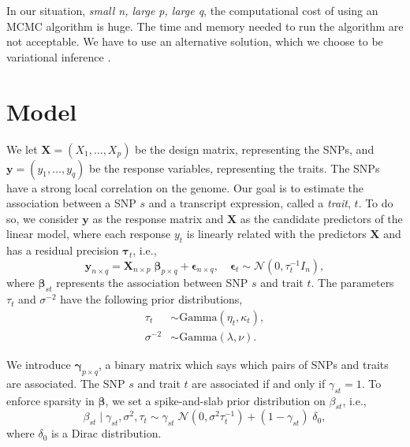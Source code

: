 \documentclass[a4paper, 11pt]{report}
\numberwithin{equation}{section}
\begin{document}
In our situation, \textit{small n, large p, large q}, the computational cost of using an MCMC algorithm is huge. The time and memory needed to run the algorithm are not acceptable. We have to use an alternative solution, which we choose to be variational inference \cite{varInf}.
\newpage
\chapter{Model}
We let $\boldsymbol{X }= (X_1,\ldots,X_p)$ be the design matrix, representing the SNPs, and $\boldsymbol{y} = (y_1,\ldots,y_q)$ be the response variables, representing the traits. The SNPs have a strong local correlation on the genome. Our goal is to estimate the association between a SNP $s$ and a transcript expression, called a \textit{trait}, $t$. To do so, we consider $\boldsymbol{y}$ as the response matrix and $\boldsymbol{X}$ as the candidate predictors of the linear model, where each response $y_t$ is linearly related with the predictors $\boldsymbol{X}$ and has a residual precision $\boldsymbol{\tau}_t$, i.e.,
\begin{equation*}
\label{eq:model}
\boldsymbol{y}_{n\times q} = \boldsymbol{X}_{n \times p}\;\boldsymbol{\beta}_{p \times q}+\boldsymbol{\epsilon}_{n \times q},\quad\boldsymbol{\epsilon}_t \sim \mathcal{N}(0,\tau_t^{-1}I_n),
\end{equation*}
where $\boldsymbol{\beta}_{st}$ represents the association between SNP $s$ and trait $t$. The parameters $\tau_t$ and $\sigma^{-2}$ have the following prior distributions,
\begin{align*}
\tau_t &\sim \text{Gamma}(\eta_t,\kappa_t),\\
\sigma^{-2} &\sim \text{Gamma}(\lambda,\nu).
\end{align*}

We introduce $\boldsymbol{\gamma}_{p\times q}$, a binary matrix which says which pairs of SNPs and traits are associated. The SNP $s$ and trait $t$ are associated if and only if $\gamma_{st} = 1$. To enforce sparsity in $\boldsymbol{\beta}$, we set a spike-and-slab prior distribution on $\beta_{st}$, i.e.,
\begin{equation*}
\beta_{st} \mid \gamma_{st},\sigma^2, \tau_t \sim \gamma_{st}\;\mathcal{N}(0,\sigma^2\tau_t^{-1})+(1-\gamma_{st})\;\delta_0,
\end{equation*}
where $\delta_0$ is a Dirac distribution.
\end{document}
